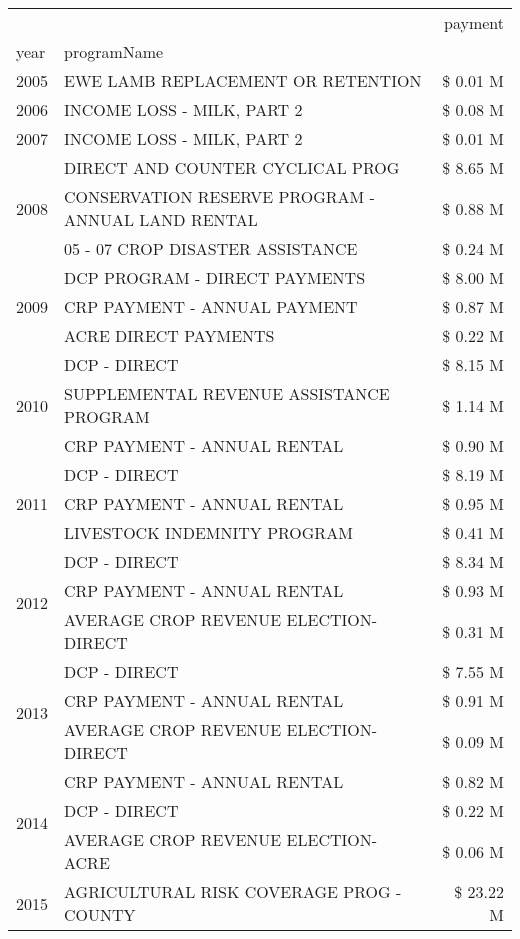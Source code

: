\begin{tabular}{llr}
\toprule
 &  & payment \\
year & programName &  \\
\midrule
2005 & EWE LAMB REPLACEMENT OR RETENTION & \$ 0.01 M \\
\cline{1-3}
2006 & INCOME LOSS - MILK, PART 2 & \$ 0.08 M \\
\cline{1-3}
2007 & INCOME LOSS - MILK, PART 2 & \$ 0.01 M \\
\cline{1-3}
\multirow[t]{3}{*}{2008} & DIRECT AND COUNTER CYCLICAL PROG & \$ 8.65 M \\
 & CONSERVATION RESERVE PROGRAM - ANNUAL LAND RENTAL & \$ 0.88 M \\
 & 05 - 07 CROP DISASTER ASSISTANCE & \$ 0.24 M \\
\cline{1-3}
\multirow[t]{3}{*}{2009} & DCP PROGRAM - DIRECT PAYMENTS & \$ 8.00 M \\
 & CRP PAYMENT - ANNUAL PAYMENT & \$ 0.87 M \\
 & ACRE DIRECT PAYMENTS & \$ 0.22 M \\
\cline{1-3}
\multirow[t]{3}{*}{2010} & DCP - DIRECT & \$ 8.15 M \\
 & SUPPLEMENTAL REVENUE ASSISTANCE PROGRAM & \$ 1.14 M \\
 & CRP PAYMENT - ANNUAL RENTAL & \$ 0.90 M \\
\cline{1-3}
\multirow[t]{3}{*}{2011} & DCP - DIRECT & \$ 8.19 M \\
 & CRP PAYMENT - ANNUAL RENTAL & \$ 0.95 M \\
 & LIVESTOCK INDEMNITY PROGRAM & \$ 0.41 M \\
\cline{1-3}
\multirow[t]{3}{*}{2012} & DCP - DIRECT & \$ 8.34 M \\
 & CRP PAYMENT - ANNUAL RENTAL & \$ 0.93 M \\
 & AVERAGE CROP REVENUE ELECTION-DIRECT & \$ 0.31 M \\
\cline{1-3}
\multirow[t]{3}{*}{2013} & DCP - DIRECT & \$ 7.55 M \\
 & CRP PAYMENT - ANNUAL RENTAL & \$ 0.91 M \\
 & AVERAGE CROP REVENUE ELECTION-DIRECT & \$ 0.09 M \\
\cline{1-3}
\multirow[t]{3}{*}{2014} & CRP PAYMENT - ANNUAL RENTAL & \$ 0.82 M \\
 & DCP - DIRECT & \$ 0.22 M \\
 & AVERAGE CROP REVENUE ELECTION-ACRE & \$ 0.06 M \\
\cline{1-3}
\multirow[t]{3}{*}{2015} & AGRICULTURAL RISK COVERAGE PROG - COUNTY & \$ 23.22 M \\

\end{tabular}
